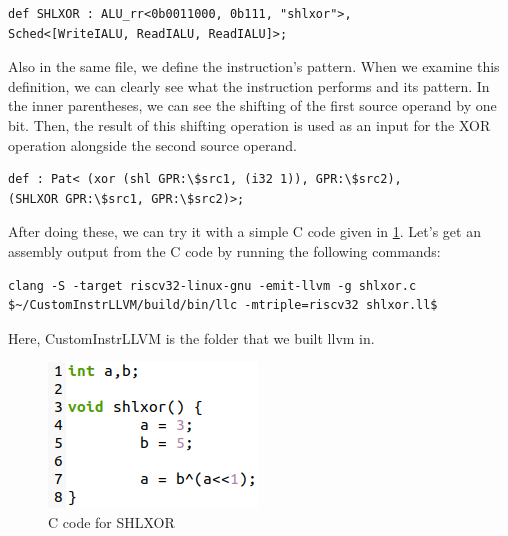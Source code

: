 \begin{lstlisting}
def SHLXOR : ALU_rr<0b0011000, 0b111, "shlxor">,
Sched<[WriteIALU, ReadIALU, ReadIALU]>;
\end{lstlisting}

Also in the same file, we define the instruction’s pattern. When we examine this definition, we can clearly see what the instruction performs and its pattern. In the inner parentheses, we can see the shifting of the first source operand by one bit. Then, the result of this shifting operation is used as an input for the XOR operation alongside the second source operand.

\begin{lstlisting}
def : Pat< (xor (shl GPR:\$src1, (i32 1)), GPR:\$src2),
(SHLXOR GPR:\$src1, GPR:\$src2)>;
\end{lstlisting}

After doing these, we can try it with a simple C code given in \ref{fig:c_code_for_shlxor}. Let’s get an assembly output from the C code by running the following commands:

\begin{lstlisting}
clang -S -target riscv32-linux-gnu -emit-llvm -g shlxor.c
$~/CustomInstrLLVM/build/bin/llc -mtriple=riscv32 shlxor.ll$
\end{lstlisting}

Here, CustomInstrLLVM is the folder that we built llvm in.

\begin{figure}
    \centering
    \includegraphics{adding_new_instr/c_code_for_shlxor.png}
    \caption{C code for SHLXOR}
    \label{fig:c_code_for_shlxor}
\end{figure}

